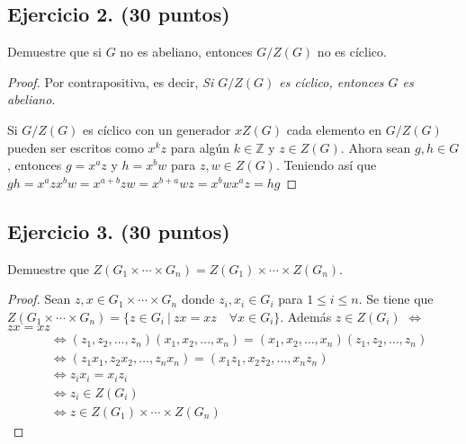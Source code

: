 \documentclass[12pt,letterpaper]{article}
\newcommand{\Z}{\mathbb{Z}}
\begin{document}
\subsection*{Ejercicio 2. (30 puntos)}
Demuestre que si $G$ no es abeliano, entonces $G/Z(G)$ no es cíclico.
\begin{proof} Por contrapositiva, es decir, \emph{Si $G/Z(G)$ es cíclico, entonces $G$ es abeliano}.

Si $G/Z(G)$ es cíclico con un generador $xZ(G)$ cada elemento en $G/Z(G)$ pueden ser escritos como
$x^k z$ para algún $k \in \Z$ y $z \in Z(G)$. Ahora sean $g, h \in G$, entonces $g = x^a z$ y
$h = x^b w$ para $z, w \in Z(G)$. Teniendo así que
$gh = x^a z x^b w = x^{a+b} zw = x^{b+a}wz = x^b w x^a z = hg$
\end{proof}

\subsection*{Ejercicio 3. (30 puntos)}
Demuestre que $Z(G_1 \times \cdots \times G_n) = Z(G_1) \times \cdots \times Z(G_n)$.
\begin{proof}
Sean $z, x \in G_1 \times \cdots \times G_n$ donde $z_i, x_i \in G_i$ para $1 \leq i \leq n$.
Se tiene que $Z(G_1 \times \cdots \times G_n) = \{ z \in G_i \ | \ zx = xz \quad \forall x \in G_i \}$.
Además $z \in Z(G_i)$ $\iff$ $zx = xz$
\begin{align*}
    &\iff (z_1, z_2, \ldots, z_n)(x_1, x_2, \ldots, x_n) = (x_1, x_2, \ldots, x_n)(z_1, z_2, \ldots , z_n)\\
    &\iff (z_1x_1, z_2x_2, \ldots, z_nx_n) = (x_1z_1, x_2z_2, \ldots, x_nz_n)\\
    &\iff z_ix_i = x_iz_i\\
    &\iff z_i \in Z(G_i)\\
    &\iff z \in Z(G_1) \times \cdots \times Z(G_n)
\end{align*}
\end{proof}






\end{document}

